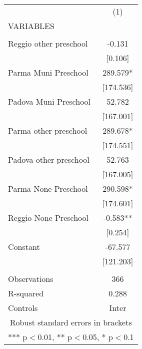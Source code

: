\begin{tabular}{lc} \hline
 & (1) \\
VARIABLES &  \\ \hline
 &  \\
Reggio other preschool & -0.131 \\
 & [0.106] \\
Parma Muni Preschool & 289.579* \\
 & [174.536] \\
Padova Muni Preschool & 52.782 \\
 & [167.001] \\
Parma other preschool & 289.678* \\
 & [174.551] \\
Padova other preschool & 52.763 \\
 & [167.005] \\
Parma None Preschool & 290.598* \\
 & [174.601] \\
Reggio None Preschool & -0.583** \\
 & [0.254] \\
Constant & -67.577 \\
 & [121.203] \\
 &  \\
Observations & 366 \\
R-squared & 0.288 \\
 Controls & Inter \\ \hline
\multicolumn{2}{c}{ Robust standard errors in brackets} \\
\multicolumn{2}{c}{ *** p$<$0.01, ** p$<$0.05, * p$<$0.1} \\
\end{tabular}
